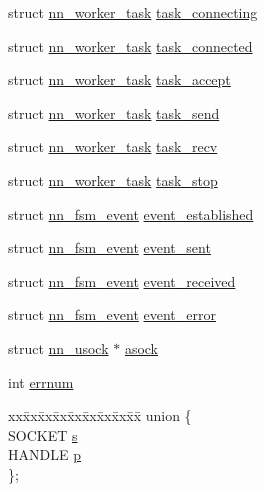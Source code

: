 \begin{DoxyCompactItemize}
\begin{tabbing}
\end{tabbing}\item 
struct \hyperlink{structnn__worker__task}{nn\+\_\+worker\+\_\+task} \hyperlink{structnn__usock_a0ae67b8a2d07fccc8857754d75dcd7f1}{task\+\_\+connecting}
\item 
struct \hyperlink{structnn__worker__task}{nn\+\_\+worker\+\_\+task} \hyperlink{structnn__usock_a0d7d18551e25a476616ab10d60ce705e}{task\+\_\+connected}
\item 
struct \hyperlink{structnn__worker__task}{nn\+\_\+worker\+\_\+task} \hyperlink{structnn__usock_a7d6bb9be8380d7ce5ab091681859d3b7}{task\+\_\+accept}
\item 
struct \hyperlink{structnn__worker__task}{nn\+\_\+worker\+\_\+task} \hyperlink{structnn__usock_a5db90aa2055ddefeae86903bf1df35d3}{task\+\_\+send}
\item 
struct \hyperlink{structnn__worker__task}{nn\+\_\+worker\+\_\+task} \hyperlink{structnn__usock_a9b638ca950a635cc49e7eb17f0b73d07}{task\+\_\+recv}
\item 
struct \hyperlink{structnn__worker__task}{nn\+\_\+worker\+\_\+task} \hyperlink{structnn__usock_ade4ecaabd4210ac86a29d61cfbf346bc}{task\+\_\+stop}
\item 
struct \hyperlink{structnn__fsm__event}{nn\+\_\+fsm\+\_\+event} \hyperlink{structnn__usock_a3bea73503d270099926b2e38b66d08f2}{event\+\_\+established}
\item 
struct \hyperlink{structnn__fsm__event}{nn\+\_\+fsm\+\_\+event} \hyperlink{structnn__usock_a00d977a2443f72c36d498caada54cec2}{event\+\_\+sent}
\item 
struct \hyperlink{structnn__fsm__event}{nn\+\_\+fsm\+\_\+event} \hyperlink{structnn__usock_ad88294c9778826548ec88eb0d7ec1789}{event\+\_\+received}
\item 
struct \hyperlink{structnn__fsm__event}{nn\+\_\+fsm\+\_\+event} \hyperlink{structnn__usock_a00fa9612c702d6f3f97439326b53b617}{event\+\_\+error}
\item 
struct \hyperlink{structnn__usock}{nn\+\_\+usock} $\ast$ \hyperlink{structnn__usock_ac14b365a5a0e446a5d3f0ae2a7e7a642}{asock}
\item 
int \hyperlink{structnn__usock_a9342db14fcddb2856a24d062e1eb2516}{errnum}
\item 
\begin{tabbing}
xx\=xx\=xx\=xx\=xx\=xx\=xx\=xx\=xx\=\kill
union \{\\
\>SOCKET \hyperlink{structnn__usock_a63a7149fe4ffae3b39c05bb6a9c0d11e}{s}\\
\>HANDLE \hyperlink{structnn__usock_a156a09f286268517711bc6d13137be3d}{p}\\
\}; \\


\end{tabbing}
\end{DoxyCompactItemize}
